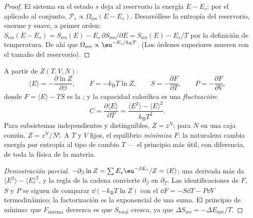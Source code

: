 \begin{proof}
El sistema en el estado $s$ deja al reservorio la energía $E - E_s$:
por el  aplicado al conjunto, $\mathcal P_s
\propto \Omega_{\text{res}}(E - E_s)$. Desarróllese la entropía del
reservorio, enorme y suave, a primer orden: $S_{\text{res}}(E - E_s)
= S_{\text{res}}(E) - E_s\,\partial S_{\text{res}}/\partial E =
S_{\text{res}}(E) - E_s/T$ por la definición de temperatura. De ahí que
$\Omega_{\text{res}} \propto \eu^{-E_s/k_{\text{B}}T}$. (Los órdenes
superiores mueren con el tamaño del reservorio).
\end{proof}

\begin{proposition}[La máquina]\label{prop:b3:canonical-ensemble:machine}
A partir de $Z(T, V, N)$:
\[
\langle E\rangle = -\frac{\partial\ln Z}{\partial\beta} , \qquad
F = -k_{\text{B}}T\ln Z , \qquad
S = -\frac{\partial F}{\partial T} , \qquad
P = -\frac{\partial F}{\partial V} ,
\]
donde $F = \langle E\rangle - TS$ es la \emph{}; y
la capacidad calorífica es una \emph{fluctuación}:
\[
C = \frac{\partial\langle E\rangle}{\partial T}
 = \frac{\langle E^2\rangle - \langle E\rangle^2}
{k_{\text{B}}T^2} .
\]
Para subsistemas independientes y distinguibles, $Z = z^N$; para $N$
 en una caja común, $Z = z^N/N!$. A $T$ y $V$
fijos, el equilibrio \emph{minimiza} $F$: la naturaleza cambia energía por
entropía al tipo de cambio $T$ --- el principio más útil, con diferencia, de
toda la física de la materia.
\end{proposition}

\begin{proof}[Demostración parcial]
$-\partial_\beta\ln Z = \sum E_s\eu^{-\beta E_s}/Z = \langle
E\rangle$; una derivada más da $\langle E^2\rangle - \langle
E\rangle^2$, y la regla de la cadena convierte $\partial_\beta$ en
$\partial_T$. Las identificaciones de $F$, $S$ y $P$ se siguen de
comparar $\dd(-k_{\text{B}}T\ln Z)$ con el
$\dd F = -S\dd T - P\dd V$ termodinámico; la factorización es la
exponencial de una suma. El principio de mínimo: que $F_{\text{sistema}}$
decrezca es que $S_{\text{total}}$ crezca, ya que $\Delta S_{\text{res}} =
-\Delta E_{\text{sist}}/T$.
\end{proof}


